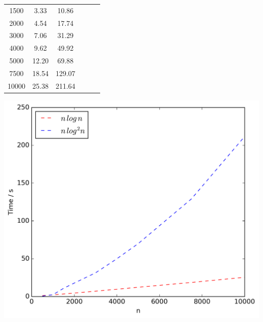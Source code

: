 \documentclass[final,1p,times]{elsarticle}
\begin{document}
\begin{table}[!ht]
\begin{minipage}{0.48\textwidth}
\begin{tabular}{c||ccccc}
                1500 & 3.33 & 10.86\\
                2000 & 4.54 & 17.74\\
                3000 & 7.06 & 31.29\\
                4000 & 9.62 & 49.92\\
                5000 & 12.20 & 69.88\\
                7500 & 18.54 & 129.07\\
                10000 & 25.38 & 211.64\\
            \end{tabular}
            \includegraphics[scale=0.4]{varyingn1_filter}
        \end{minipage}
        \label{fig:expresults1}
    \end{table}
\end{document}
